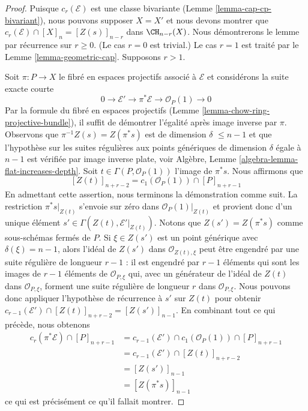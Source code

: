 \begin{proof}
Puisque $c_r(\mathcal{E})$ est une classe bivariante
(Lemme \ref{lemma-cap-cp-bivariant}),
nous pouvons supposer $X = X'$ et nous devons montrer que
$c_r(\mathcal{E}) \cap [X]_n = [Z(s)]_{n - r}$ dans $\CH_{n - r}(X)$.
Nous démontrerons le lemme par récurrence sur $r \geq 0$. (Le cas
$r = 0$ est trivial.) Le cas $r = 1$
est traité par le Lemme \ref{lemma-geometric-cap}. Supposons $r > 1$.

\medskip\noindent
Soit $\pi : P \to X$ le fibré en espaces projectifs associé à
$\mathcal{E}$ et considérons la suite exacte courte
$$
0 \to \mathcal{E}' \to \pi^*\mathcal{E} \to \mathcal{O}_P(1) \to 0
$$
Par la formule du fibré en espaces projectifs
(Lemme \ref{lemma-chow-ring-projective-bundle}),
il suffit de démontrer l'égalité après image inverse par $\pi$.
Observons que $\pi^{-1}Z(s) = Z(\pi^*s)$ est de dimension $\delta$
$\leq n - 1$ et que l'hypothèse sur les suites régulières aux
points génériques de dimension $\delta$ égale à $n - 1$ est vérifiée par
image inverse plate, voir
Algèbre, Lemme \ref{algebra-lemma-flat-increases-depth}.
Soit $t \in \Gamma(P, \mathcal{O}_P(1))$ l'image de $\pi^*s$.
Nous affirmons que
$$
[Z(t)]_{n + r - 2} = c_1(\mathcal{O}_P(1)) \cap [P]_{n + r - 1}
$$
En admettant cette assertion, nous terminons la démonstration comme suit.
La restriction $\pi^*s|_{Z(t)}$ s'envoie sur zéro dans
$\mathcal{O}_P(1)|_{Z(t)}$ et provient donc d'un unique
élément $s' \in \Gamma(Z(t), \mathcal{E}'|_{Z(t)})$.
Notons que $Z(s') = Z(\pi^*s)$ comme sous-schémas fermés de $P$.
Si $\xi \in Z(s')$ est un point générique avec $\delta(\xi) = n - 1$,
alors l'idéal de $Z(s')$ dans $\mathcal{O}_{Z(t), \xi}$
peut être engendré par une suite régulière de longueur $r - 1$ : il est engendré par
$r - 1$ éléments qui sont les images de $r - 1$ éléments de
$\mathcal{O}_{P, \xi}$ qui, avec un générateur de
l'idéal de $Z(t)$ dans $\mathcal{O}_{P, \xi}$, forment une suite régulière
de longueur $r$ dans $\mathcal{O}_{P, \xi}$. Nous pouvons donc appliquer
l'hypothèse de récurrence à $s'$ sur $Z(t)$ pour obtenir
$c_{r - 1}(\mathcal{E}') \cap [Z(t)]_{n + r - 2} = [Z(s')]_{n - 1}$.
En combinant tout ce qui précède, nous obtenons
\begin{align*}
c_r(\pi^*\mathcal{E}) \cap [P]_{n + r - 1}
& =
c_{r - 1}(\mathcal{E}') \cap c_1(\mathcal{O}_P(1)) \cap [P]_{n + r - 1} \\
& =
c_{r - 1}(\mathcal{E}') \cap [Z(t)]_{n + r - 2} \\
& =
[Z(s')]_{n - 1} \\
& = [Z(\pi^*s)]_{n - 1}
\end{align*}
ce qui est précisément ce qu'il fallait montrer.


\end{proof}
